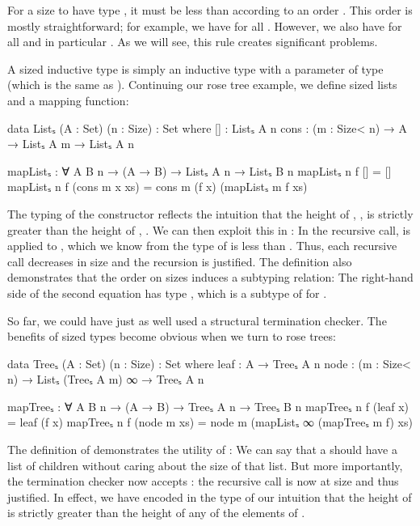For a size  to have type , it must be less than
 according to an order \icode{<}. This order is mostly straightforward;
for example, we have  for all . However, we also have
 for all  and in particular . As we will see,
this rule creates significant problems.

A sized inductive type is simply an inductive type with a parameter of type
 (which is the same as ). Continuing our rose tree
example, we define sized lists and a mapping function:
\begin{code}
  data Listₛ (A : Set) (n : Size) : Set where
    []   : Listₛ A n
    cons : (m : Size< n) → A → Listₛ A m → Listₛ A n

  mapListₛ : ∀ {A B} n → (A → B) → Listₛ A n → Listₛ B n
  mapListₛ n f []            = []
  mapListₛ n f (cons m x xs) = cons m (f x) (mapListₛ m f xs)
\end{code}
The typing of the  constructor reflects the intuition that the
height of , , is strictly greater than the height of
, . We can then exploit this in : In the
recursive call,  is applied to , which we know from the
type of  is less than . Thus, each recursive call decreases
in size and the recursion is justified. The definition also demonstrates that
the order on sizes induces a subtyping relation: The right-hand side of the
second equation has type , which is a subtype of  for .

So far, we could have just as well used a structural termination checker. The
benefits of sized types become obvious when we turn to rose trees:
\begin{code}
  data Treeₛ (A : Set) (n : Size) : Set where
    leaf : A → Treeₛ A n
    node : (m : Size< n) → Listₛ (Treeₛ A m) ∞ → Treeₛ A n

  mapTreeₛ : ∀ {A B} n → (A → B) → Treeₛ A n → Treeₛ B n
  mapTreeₛ n f (leaf x)    = leaf (f x)
  mapTreeₛ n f (node m xs) = node m (mapListₛ ∞ (mapTreeₛ m f) xs)
\end{code}
The definition of  demonstrates the utility of : We can
say that a  should have a list of children without caring about the
size of that list. But more importantly, the termination checker now accepts
: the recursive call is now at size  and thus
justified. In effect, we have encoded in the type of  our intuition
that the height of  is strictly greater than the height of any of
the elements of .

